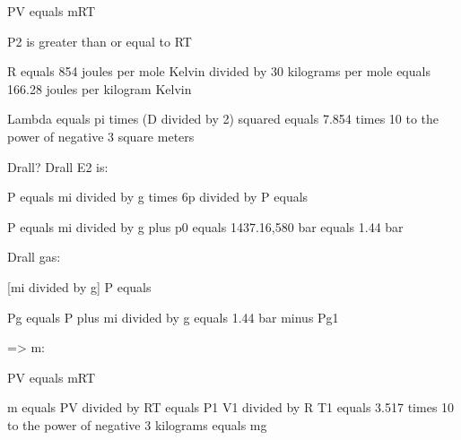 PV equals mRT

P2 is greater than or equal to RT

R equals 854 joules per mole Kelvin divided by 30 kilograms per mole equals 166.28 joules per kilogram Kelvin

Lambda equals pi times (D divided by 2) squared equals 7.854 times 10 to the power of negative 3 square meters

Drall? Drall E2 is:

P equals mi divided by g times 6p divided by P equals

P equals mi divided by g plus p0 equals 1437.16,580 bar equals 1.44 bar

Drall gas:

[mi divided by g] P equals

Pg equals P plus mi divided by g equals 1.44 bar minus Pg1

=> m:

PV equals mRT

m equals PV divided by RT equals P1 V1 divided by R T1 equals 3.517 times 10 to the power of negative 3 kilograms equals mg